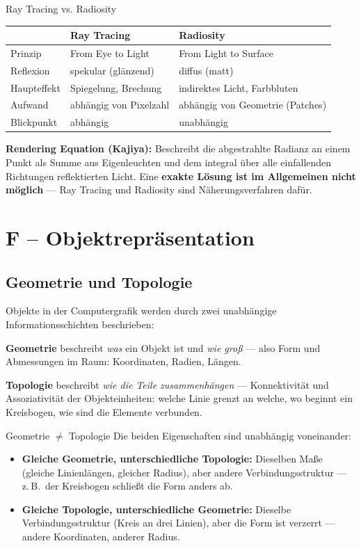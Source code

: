 \documentclass[12pt, a4paper]{article}
\begin{document}
\begin{notebox}{Ray Tracing vs. Radiosity}
\begin{tabular}{lll}
  & \textbf{Ray Tracing} & \textbf{Radiosity} \\
  \hline
  Prinzip & From Eye to Light & From Light to Surface \\
  Reflexion & spekular (glänzend) & diffus (matt) \\
  Haupteffekt & Spiegelung, Brechung & indirektes Licht, Farbbluten \\
  Aufwand & abhängig von Pixelzahl & abhängig von Geometrie (Patches) \\
  Blickpunkt & abhängig & unabhängig \\
\end{tabular}
\end{notebox}

\textbf{Rendering Equation (Kajiya):} Beschreibt die abgestrahlte Radianz an einem Punkt als Summe aus Eigenleuchten und dem integral über alle einfallenden Richtungen reflektierten Licht. Eine \textbf{exakte Lösung ist im Allgemeinen nicht möglich} — Ray Tracing und Radiosity sind Näherungsverfahren dafür.

\section{F -- Objektrepräsentation}

\subsection{Geometrie und Topologie}

Objekte in der Computergrafik werden durch zwei unabhängige Informationsschichten beschrieben:

\textbf{Geometrie} beschreibt \textit{was} ein Objekt ist und \textit{wie groß} — also Form und Abmessungen im Raum: Koordinaten, Radien, Längen.

\textbf{Topologie} beschreibt \textit{wie die Teile zusammenhängen} — Konnektivität und Assoziativität der Objekteinheiten: welche Linie grenzt an welche, wo beginnt ein Kreisbogen, wie sind die Elemente verbunden.

\begin{notebox}{Geometrie $\neq$ Topologie}
Die beiden Eigenschaften sind unabhängig voneinander:
\begin{itemize}
  \item \textbf{Gleiche Geometrie, unterschiedliche Topologie:} Dieselben Maße (gleiche Linienlängen, gleicher Radius), aber andere Verbindungsstruktur — z.\,B.\ der Kreisbogen schließt die Form anders ab.
  \item \textbf{Gleiche Topologie, unterschiedliche Geometrie:} Dieselbe Verbindungsstruktur (Kreis an drei Linien), aber die Form ist verzerrt — andere Koordinaten, anderer Radius.
\end{itemize}
\end{notebox}
\end{document}
